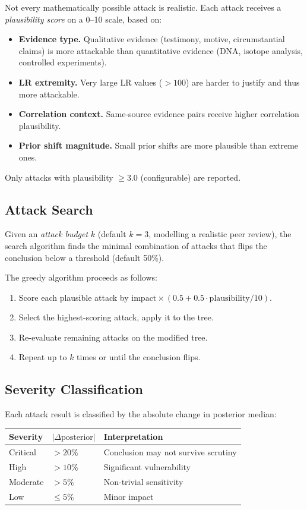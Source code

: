 \documentclass[11pt,a4paper]{article}
\begin{document}
Not every mathematically possible attack is realistic.  Each attack receives a
\emph{plausibility score} on a 0--10 scale, based on:
\begin{itemize}
\item \textbf{Evidence type.}  Qualitative evidence (testimony, motive,
  circumstantial claims) is more attackable than quantitative evidence (DNA,
  isotope analysis, controlled experiments).
\item \textbf{LR extremity.}  Very large LR values ($> 100$) are harder to
  justify and thus more attackable.
\item \textbf{Correlation context.}  Same-source evidence pairs receive higher
  correlation plausibility.
\item \textbf{Prior shift magnitude.}  Small prior shifts are more plausible
  than extreme ones.
\end{itemize}
Only attacks with plausibility $\geq 3.0$ (configurable) are reported.

\subsection{Attack Search}

Given an \emph{attack budget} $k$ (default $k = 3$, modelling a realistic peer
review), the search algorithm finds the minimal combination of attacks that
flips the conclusion below a threshold (default 50\%).

The greedy algorithm proceeds as follows:
\begin{enumerate}
\item Score each plausible attack by $\text{impact} \times (0.5 + 0.5 \cdot
  \text{plausibility}/10)$.
\item Select the highest-scoring attack, apply it to the tree.
\item Re-evaluate remaining attacks on the modified tree.
\item Repeat up to $k$ times or until the conclusion flips.
\end{enumerate}

\subsection{Severity Classification}

Each attack result is classified by the absolute change in posterior median:
\begin{center}
\begin{tabular}{lll}
\textbf{Severity} & $|\Delta \text{posterior}|$ & \textbf{Interpretation} \\
\hline
Critical & $> 20\%$ & Conclusion may not survive scrutiny \\
High     & $> 10\%$ & Significant vulnerability \\
Moderate & $> 5\%$  & Non-trivial sensitivity \\
Low      & $\leq 5\%$ & Minor impact \\
\end{tabular}
\end{center}
\end{document}
